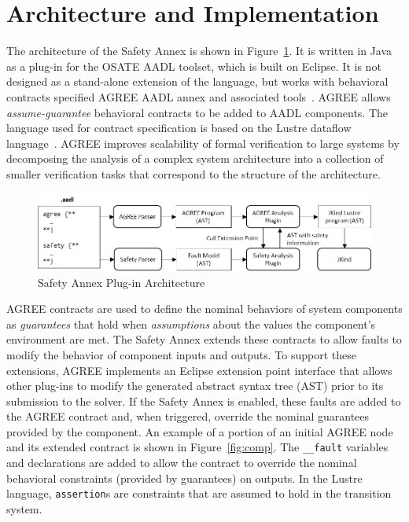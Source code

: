 \section{Architecture and Implementation}


The architecture of the Safety Annex is shown in Figure~\ref{fig:plugin-arch}.  It is written in Java as a plug-in for the OSATE AADL toolset, which is built on Eclipse.  It is not designed as a stand-alone extension of the language, but works with behavioral contracts specified AGREE AADL annex and associated tools~\cite{NFM2012:CoGaMiWhLaLu}.  AGREE allows {\em assume-guarantee} behavioral contracts to be added to AADL components.  The language used for contract specification is based on the Lustre dataflow language~\cite{Halbwachs91:IEEE}. AGREE improves scalability of formal verification to large systems by decomposing the analysis of a complex system architecture into a collection of smaller verification tasks that correspond to the structure of the architecture.

\begin{figure}
\begin{center}
\includegraphics[width=.9\textwidth]{images/arch.png}
\end{center}
\vspace{-0.2in}
\caption{Safety Annex Plug-in Architecture}
\label{fig:plugin-arch}
\end{figure}

AGREE contracts are used to define the nominal behaviors of system components as {\em guarantees} that hold when {\em assumptions} about the values the component's environment are met.  The Safety Annex extends these contracts to allow faults to modify the behavior of component inputs and outputs.  To support these extensions, AGREE implements an Eclipse extension point interface that allows other plug-ins to modify the generated abstract syntax tree (AST) prior to its submission to the solver.  If the Safety Annex is enabled, these faults are added to the AGREE contract and, when triggered, override the nominal guarantees provided by the component.  An example of a portion of an initial AGREE node and its extended contract is shown in Figure~\ref{fig:comp}.  The \texttt{\_\_fault} variables and declarations are added to allow the contract to override the nominal behavioral constraints (provided by guarantees) on outputs.  In the Lustre language, \texttt{assertion}s are constraints that are assumed to hold in the transition system.

